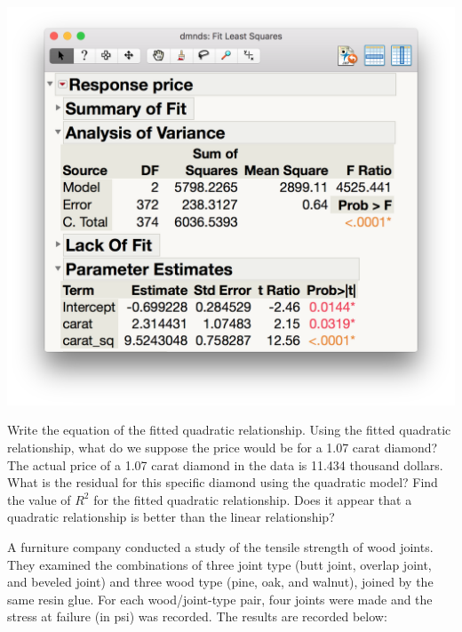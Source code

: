 \documentclass[addpoints]{examsetup}\usepackage[]{graphicx}\usepackage[]{color}
\begin{document}
\begin{questions}
\begin{parts}
   \centerline{\includegraphics[scale=.35]{carat_sq_fit}}

   \begin{subparts}
      \subpart[5] Write the equation of the fitted quadratic relationship.
      \vspace{2cm}
      \subpart[3] Using the fitted quadratic relationship, what do we suppose the price would be for a 1.07 carat diamond?
      \vspace{2cm}
      \subpart[3] The actual price of a 1.07 carat diamond in the data is 11.434 thousand dollars. What is the residual for this specific diamond using the quadratic model?
      \vspace{2cm}
      \subpart[3] Find the value of $R^2$ for the fitted quadratic relationship.
      \vspace{2cm}
      \subpart[3] Does it appear that a quadratic relationship is better than the linear relationship?
      \vspace{2cm}
   \end{subparts}
\end{parts}

\newpage

\question

A furniture company conducted a study of the tensile strength of wood joints. They examined the combinations of three joint type (butt joint, overlap joint, and beveled joint) and three wood type (pine, oak, and walnut), joined by the same resin glue.
For each wood/joint-type pair, four joints were made and the stress at failure (in psi) was recorded. The results are recorded below:


\end{questions}
\end{document}
